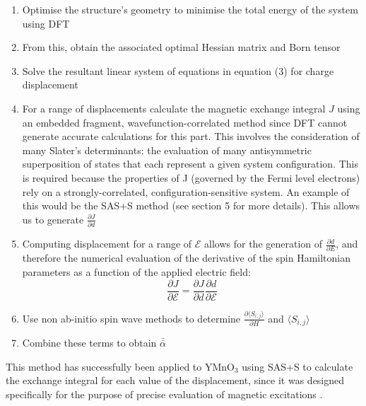 \documentclass[10pt]{article}
\begin{document}
\begin{enumerate}
	\item Optimise the structure's geometry to minimise the total energy of the system using DFT
	\item From this, obtain the associated optimal Hessian matrix and Born tensor
	\item Solve the resultant linear system of equations in equation (3) for charge displacement
	\item For a range of displacements calculate the magnetic exchange integral $J$ using an embedded fragment, wavefunction-correlated method since DFT cannot generate accurate calculations for this part. This involves the consideration of many Slater's determinants: the evaluation of many antisymmetric superposition of states that each represent a given system configuration. This is required because the properties of J (governed by the Fermi level electrons) rely on a strongly-correlated, configuration-sensitive system. An example of this would be the SAS+S method (see section 5 for more details). This allows us to generate $\frac{\partial J}{\partial d}$
	\item Computing displacement for a range of $\mathcal{E}$ allows for the generation of $\frac{\partial d}{\partial E}$, and therefore the numerical evaluation of the derivative of the spin Hamiltonian parameters as a function of the applied electric field:
	\begin{equation*}
	\dfrac{\partial J}{\partial \mathcal{E}} = \dfrac{\partial J}{\partial d}\dfrac{\partial d}{\partial \mathcal{E}}
	\end{equation*}
	\item Use non ab-initio spin wave methods to determine $\frac{\partial\langle S_{i,j}\rangle}{\partial H}$ and $\langle S_{i,j}\rangle$
	\item Combine these terms to obtain $\bar{\bar{\alpha}}$
\end{enumerate}

This method has successfully been applied to YMnO$_3$ using SAS+S to calculate the exchange integral for each value of the displacement, since it was designed specifically for the purpose of precise evaluation of magnetic excitations \cite{varignon2013ab}.
\end{document}
